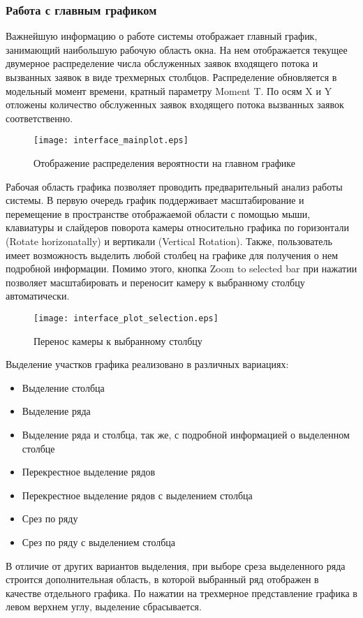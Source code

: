 \subsubsection{Работа с главным графиком}
Важнейшую информацию о работе системы отображает главный график, занимающий наибольшую рабочую область окна. На нем отображается текущее двумерное распределение числа обслуженных заявок входящего потока и вызванных заявок в виде трехмерных столбцов. Распределение обновляется в модельный момент времени, кратный параметру Moment T. По осям X и Y отложены количество обслуженных заявок входящего потока вызванных заявок соответственно.
\begin{figure}[H]
	\centering
	\texttt{[image: interface\_mainplot.eps]}
	\caption{Отображение распределения вероятности на главном графике}
	\label{interface_mainplot}
\end{figure}
Рабочая область графика позволяет проводить предварительный анализ работы системы. В первую очередь график поддерживает масштабирование и перемещение в пространстве отображаемой области с помощью мыши, клавиатуры и слайдеров поворота камеры относительно графика по горизонтали (Rotate horizonatally) и вертикали (Vertical Rotation).  Также, пользователь имеет возможность выделить любой столбец на графике для получения о нем подробной информации. Помимо этого, кнопка Zoom to selected bar при нажатии позволяет масштабировать и переносит камеру к выбранному столбцу автоматически.
\begin{figure}[H]
	\centering
	\texttt{[image: interface\_plot\_selection.eps]}
	\caption{Перенос камеры к выбранному столбцу}
	\label{interface_plot_selection}
\end{figure}
Выделение участков графика реализовано в различных вариациях:
\begin{itemize}
	\item Выделение столбца
	\item Выделение ряда
	\item Выделение ряда и столбца, так же, с подробной информацией о выделенном столбце
	\item Перекрестное выделение рядов
	\item Перекрестное выделение рядов с выделением столбца
	\item Срез по ряду
	\item Срез по ряду с выделением столбца
\end{itemize}
В отличие от других вариантов выделения, при выборе среза выделенного ряда строится дополнительная область, в которой выбранный ряд отображен в качестве отдельного графика. По нажатии на трехмерное представление графика в левом верхнем углу, выделение сбрасывается.
